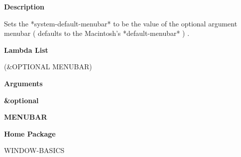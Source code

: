  
{\bf Description}

Sets the *system-default-menubar* to be the value of the optional argument menubar ( defaults to the Macintosh's *default-menubar* ) .

 
{\bf Lambda List}

(\&OPTIONAL MENUBAR)

 
{\bf Arguments}


\beginhang
{\bf \&optional}\hspace{2em}
 
{\bf MENUBAR}


 
\endhang
 
{\bf Home Package}

WINDOW-BASICS


